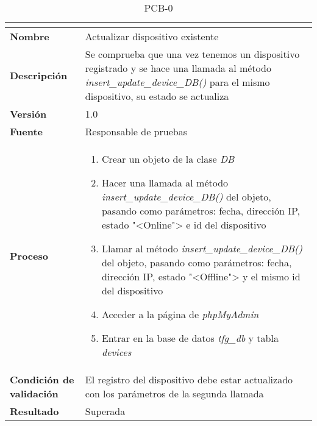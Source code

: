 \begin{table}[H]
	\caption{PCB-0\number\pcb}
	\begin{tabular}{|l|p{}|}
		\hline
		\multicolumn{2}{|c|}{\cellcolor[HTML]{BFBFBF}{\color[HTML]{000000} \textbf{PCB-0\number\pcb}}} \\ \hline
		\textbf{Nombre}                  & Actualizar dispositivo existente                                                                                                                                                   \\ \hline
		\textbf{Descripción}             & Se comprueba que una vez tenemos un dispositivo registrado y se hace una llamada al método \textit{insert\_update\_device\_DB()} para el mismo dispositivo, su estado se actualiza \\ \hline
		\textbf{Versión}                 & 1.0                                                                                                                                                                                \\ \hline
		\textbf{Fuente}                  & Responsable de pruebas                                                                                                                                                             \\ \hline
		\textbf{Proceso}                 & \begin{enumerate}
			\item Crear un objeto de la clase \textit{DB}
			\item Hacer una llamada al método \textit{insert\_update\_device\_DB()} del objeto, pasando como parámetros: fecha, dirección IP, estado "<Online"> e id del dispositivo
			\item Llamar al método \textit{insert\_update\_device\_DB()} del objeto, pasando como parámetros: fecha, dirección IP, estado "<Offline"> y el mismo id del dispositivo
			\item Acceder a la página de \textit{phpMyAdmin}
			\item Entrar en la base de datos \textit{tfg\_db} y tabla \textit{devices}
		\end{enumerate}                                                                                                                                                          \\ \hline
		\textbf{Condición de validación} & El registro del dispositivo debe estar actualizado con los parámetros de la segunda llamada                                                                                        \\ \hline
		\textbf{Resultado}               & Superada                                                                                                                                                                           \\ \hline
	\end{tabular}
\end{table}

